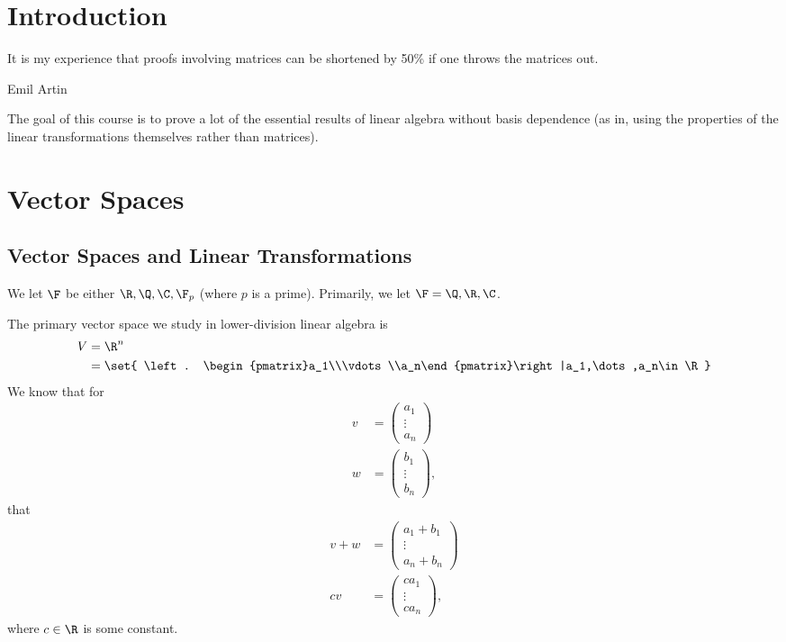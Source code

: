 \documentclass[10pt]{mypackage}
\begin{document}
\RaggedRight
\section{Introduction}%
\epigraph{It is my experience that proofs involving matrices can be shortened by 50\% if one throws the matrices out.}{Emil Artin}
The goal of this course is to prove a lot of the essential results of linear algebra without basis dependence (as in, using the properties of the linear transformations themselves rather than matrices).
\tableofcontents
\section{Vector Spaces}%
\subsection{Vector Spaces and Linear Transformations}
\begin{remark}
We let $\F$ be either $\R,\Q,\C,\F_{p}$ (where $p$ is a prime). Primarily, we let $\F = \Q,\R,\C$.\newline
\end{remark}
\begin{example}
  The primary vector space we study in lower-division linear algebra is
  \begin{align*}
    V &= \R^n\\
      &= \set{ \left. \begin{pmatrix}a_1\\\vdots\\a_n\end{pmatrix}\right|a_1,\dots,a_n\in \R }
  \end{align*}
  We know that for
  \begin{align*}
    v &= \begin{pmatrix}a_1\\\vdots\\a_n\end{pmatrix}\\
    w &= \begin{pmatrix}b_1\\\vdots\\b_n\end{pmatrix},
  \end{align*}
  that
  \begin{align*}
    v+w &= \begin{pmatrix}a_1 + b_1\\\vdots\\a_n + b_n\end{pmatrix}\\
    cv &= \begin{pmatrix}ca_1 \\\vdots\\ca_n\end{pmatrix},
  \end{align*}
  where $c\in\R$ is some constant.
\end{example}
\end{document}
